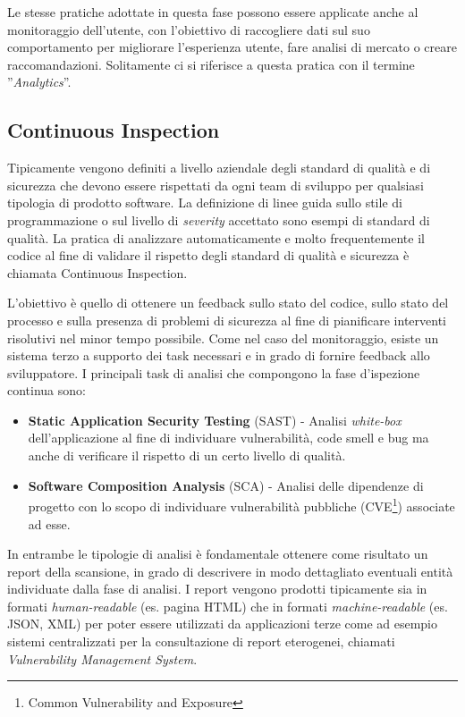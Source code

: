 Le stesse pratiche adottate in questa fase possono essere applicate anche al monitoraggio dell'utente,
con l'obiettivo di raccogliere dati sul suo comportamento per migliorare l'esperienza utente, 
fare analisi di mercato o creare raccomandazioni. 
Solitamente ci si riferisce a questa pratica con il termine ''\textit{Analytics}''.

\subsection{Continuous Inspection}
Tipicamente vengono definiti a livello aziendale degli standard di qualità e di sicurezza che devono essere rispettati da ogni team di sviluppo per qualsiasi tipologia di prodotto software. 
La definizione di linee guida sullo stile di programmazione o sul livello di \textit{severity} accettato sono esempi di standard di qualità. 
La pratica di analizzare automaticamente e molto frequentemente il codice al fine di validare il rispetto degli standard di qualità e sicurezza è chiamata Continuous Inspection.

L’obiettivo è quello di ottenere un feedback sullo stato del codice, 
sullo stato del processo e sulla presenza di problemi di sicurezza al fine di pianificare interventi risolutivi nel minor tempo possibile.
Come nel caso del monitoraggio, 
esiste un sistema terzo a supporto dei task necessari e in grado di fornire feedback allo sviluppatore. 
I principali task di analisi che compongono la fase d'ispezione continua sono:

\begin{itemize}
    \item \textbf{Static Application Security Testing} (SAST) - Analisi \textit{white-box} dell'applicazione al fine di individuare vulnerabilità, code smell e bug ma anche di verificare il rispetto di un certo livello di qualità.
    
    \item \textbf{Software Composition Analysis} (SCA) - Analisi delle dipendenze di progetto con lo scopo di individuare vulnerabilità pubbliche (CVE\footnote{Common Vulnerability and Exposure}) associate ad esse.
\end{itemize}

In entrambe le tipologie di analisi è fondamentale ottenere come risultato un report della scansione, 
in grado di descrivere in modo dettagliato eventuali entità individuate dalla fase di analisi. 
I report vengono prodotti tipicamente sia in formati \textit{human-readable} (es. pagina HTML) che in formati \textit{machine-readable} (es. JSON, XML) per poter essere utilizzati da applicazioni terze come ad esempio sistemi centralizzati per la consultazione di report eterogenei, chiamati \textit{Vulnerability Management System}.

